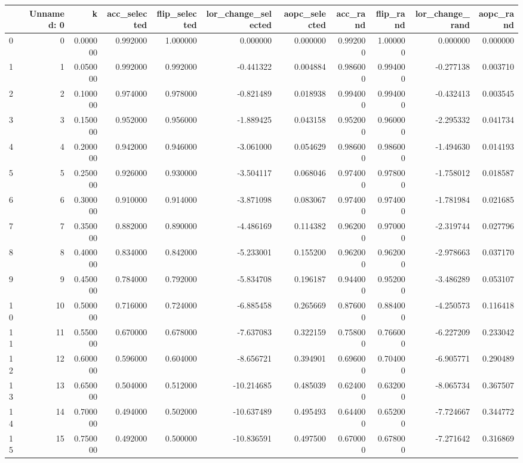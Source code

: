 \begin{tabular}{lrrrrrrrrrr}
\toprule
 & Unnamed: 0 & k & acc_selected & flip_selected & lor_change_selected & aopc_selected & acc_rand & flip_rand & lor_change_rand & aopc_rand \\
\midrule
0 & 0 & 0.000000 & 0.992000 & 1.000000 & 0.000000 & 0.000000 & 0.992000 & 1.000000 & 0.000000 & 0.000000 \\
1 & 1 & 0.050000 & 0.992000 & 0.992000 & -0.441322 & 0.004884 & 0.986000 & 0.994000 & -0.277138 & 0.003710 \\
2 & 2 & 0.100000 & 0.974000 & 0.978000 & -0.821489 & 0.018938 & 0.994000 & 0.994000 & -0.432413 & 0.003545 \\
3 & 3 & 0.150000 & 0.952000 & 0.956000 & -1.889425 & 0.043158 & 0.952000 & 0.960000 & -2.295332 & 0.041734 \\
4 & 4 & 0.200000 & 0.942000 & 0.946000 & -3.061000 & 0.054629 & 0.986000 & 0.986000 & -1.494630 & 0.014193 \\
5 & 5 & 0.250000 & 0.926000 & 0.930000 & -3.504117 & 0.068046 & 0.974000 & 0.978000 & -1.758012 & 0.018587 \\
6 & 6 & 0.300000 & 0.910000 & 0.914000 & -3.871098 & 0.083067 & 0.974000 & 0.974000 & -1.781984 & 0.021685 \\
7 & 7 & 0.350000 & 0.882000 & 0.890000 & -4.486169 & 0.114382 & 0.962000 & 0.970000 & -2.319744 & 0.027796 \\
8 & 8 & 0.400000 & 0.834000 & 0.842000 & -5.233001 & 0.155200 & 0.962000 & 0.962000 & -2.978663 & 0.037170 \\
9 & 9 & 0.450000 & 0.784000 & 0.792000 & -5.834708 & 0.196187 & 0.944000 & 0.952000 & -3.486289 & 0.053107 \\
10 & 10 & 0.500000 & 0.716000 & 0.724000 & -6.885458 & 0.265669 & 0.876000 & 0.884000 & -4.250573 & 0.116418 \\
11 & 11 & 0.550000 & 0.670000 & 0.678000 & -7.637083 & 0.322159 & 0.758000 & 0.766000 & -6.227209 & 0.233042 \\
12 & 12 & 0.600000 & 0.596000 & 0.604000 & -8.656721 & 0.394901 & 0.696000 & 0.704000 & -6.905771 & 0.290489 \\
13 & 13 & 0.650000 & 0.504000 & 0.512000 & -10.214685 & 0.485039 & 0.624000 & 0.632000 & -8.065734 & 0.367507 \\
14 & 14 & 0.700000 & 0.494000 & 0.502000 & -10.637489 & 0.495493 & 0.644000 & 0.652000 & -7.724667 & 0.344772 \\
15 & 15 & 0.750000 & 0.492000 & 0.500000 & -10.836591 & 0.497500 & 0.670000 & 0.678000 & -7.271642 & 0.316869 \\

\end{tabular}
